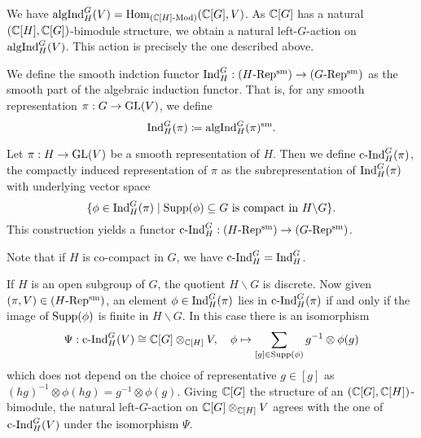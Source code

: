 \documentclass[../main.tex]{subfiles}
\begin{document}
\begin{rmk} 
  We have $\mathrm{algInd}_H^G(V) = \operatorname{Hom}_{{({\mathbb{C}[H]}\text-\allowbreak\mathrm{Mod})}}(\mathbb{C}[G], V)$. As
  $\mathbb{C}[G]$ has a natural $(\mathbb{C}[H], \mathbb{C}[G])$-bimodule structure, we obtain a natural
  left-$G$-action on $\mathrm{algInd}_H^G(V)$. This action is precisely the one
  described above.
\end{rmk}

\begin{defi}\label{def:SmoothInduction}
  We define the smooth indction functor $\mathrm{Ind}_H^G: {({H}\text-\allowbreak\mathrm{Rep^{\mathrm{sm}}})} \to {({G}\text-\allowbreak\mathrm{Rep^{\mathrm{sm}}})}$ as 
  the smooth part of the algebraic induction functor. That is, for any smooth
  representation $\pi: G \to \operatorname{GL}(V)$, we define
  \begin{equation*}
    \mathrm{Ind}_H^G(\pi) \coloneqq \mathrm{algInd}_H^G(\pi)^{\mathrm{sm}}.
  \end{equation*}
  \end{defi}

\begin{defi}\label{def:CompactInduction}
  Let $\pi: H \to \operatorname{GL}(V)$ be a smooth representation
  of $H$. Then we define $\mathrm{c\text{-}Ind}_H^G(\pi)$, the compactly induced representation of $\pi$
  as the subrepresentation of $\mathrm{Ind}_H^G(\pi)$ with underlying vector space
  \begin{equation*}
    \{\phi \in \mathrm{Ind}_H^G(\pi) \mid \operatorname{Supp}(\phi) \subseteq G \text{ is compact in }
    H\backslash G\}.
  \end{equation*}
  This construction yields a functor $\mathrm{c\text{-}Ind}_H^G: {({H}\text-\allowbreak\mathrm{Rep^{\mathrm{sm}}})} \to {({G}\text-\allowbreak\mathrm{Rep^{\mathrm{sm}}})}$. 
\end{defi}
Note that if $H$ is co-compact in $G$, we have $\mathrm{c\text{-}Ind}_H^G = \mathrm{Ind}_H^G$. 

\begin{rmk} 
  If $H$ is an open subgroup of $G$, the quotient $H \backslash G$ is 
  discrete. Now given $(\pi, V) \in {({H}\text-\allowbreak\mathrm{Rep^{\mathrm{sm}}})}$, an element $\phi \in \mathrm{Ind}_H^G(\pi)$
  lies in $\mathrm{c\text{-}Ind}_H^G(\pi)$ if and only if 
  the image of $\operatorname{Supp}(\phi)$ is finite in $H \backslash G$. 
  In this case there is an isomorphism
  \begin{equation}\label{eq:cIndTensorExpr}
    \Psi: \mathrm{c\text{-}Ind}_H^G(V) \cong \mathbb{C}[G] \otimes_{\mathbb{C}[H]} V, \quad \phi \mapsto \sum_{[g]
    \in \operatorname{Supp}(\phi)} g^{-1} \otimes \phi(g)
  \end{equation}
  which does not depend on the choice of representative $g \in [g]$ as 
  $(hg)^{-1} \otimes \phi(hg) = g^{-1} \otimes \phi(g)$. 
  Giving $\mathbb{C}[G]$ the structure of an $(\mathbb{C}[G], \mathbb{C}[H])$-bimodule, the natural
  left-$G$-action on $\mathbb{C}[G] \otimes_{\mathbb{C}[H]} V$ agrees with the one 
  of $\mathrm{c\text{-}Ind}_H^G(V)$ under the isomorphism $\Psi$. 
\end{rmk}
\end{document}
